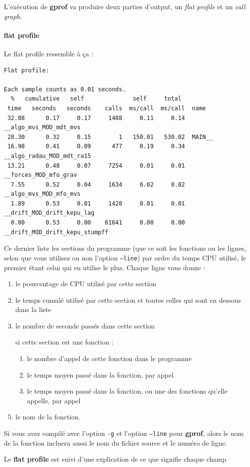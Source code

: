 \documentclass[a4paper,twoside]{article}
\begin{document}
L'exécution de \textbf{gprof} va produire deux parties d'output, un \textit{flat profile} et un \textit{call graph}.
\paragraph{flat profile}
Le flat profile ressemble à ça : 
\begin{verbatim}
Flat profile:

Each sample counts as 0.01 seconds.
  %   cumulative   self              self     total           
 time   seconds   seconds    calls  ms/call  ms/call  name    
 32.08      0.17     0.17     1488     0.11     0.14  __algo_mvs_MOD_mdt_mvs
 28.30      0.32     0.15        1   150.01   530.02  MAIN__
 16.98      0.41     0.09      477     0.19     0.34  __algo_radau_MOD_mdt_ra15
 13.21      0.48     0.07     7254     0.01     0.01  __forces_MOD_mfo_grav
  7.55      0.52     0.04     1634     0.02     0.02  __algo_mvs_MOD_mfo_mvs
  1.89      0.53     0.01     1428     0.01     0.01  __drift_MOD_drift_kepu_lag
  0.00      0.53     0.00    61641     0.00     0.00  __drift_MOD_drift_kepu_stumpff
\end{verbatim}

Ce dernier liste les sections du programme (que ce soit les fonctions ou les lignes, selon que vous utilisez ou non l'option \texttt{--line}) par ordre du temps CPU utilisé, le premier étant celui qui en utilise le plus. Chaque ligne vous donne : 
\begin{enumerate}
\item le pourcentage de CPU utilisé par cette section
\item le temps cumulé utilisé par cette section et toutes celles qui sont en dessous dans la liste
\item le nombre de seconde passés dans cette section
\item [si cette section est une fonction] : 
\begin{enumerate}
\item le nombre d'appel de cette fonction dans le programme
\item le temps moyen passé dans la fonction, par appel
\item le temps moyen passé dans la fonction, ou une des fonctions qu'elle appelle, par appel
\end{enumerate}
\item le nom de la fonction.
\end{enumerate}

\begin{remarque}
Si vous avez compilé avec l'option \texttt{-g} et l'option \texttt{--line} pour \textbf{gprof}, alors le nom de la fonction incluera aussi le nom du fichier source et le numéro de ligne. 

Le \textbf{flat profile} est suivi d'une explication de ce que signifie chaque champ.
\end{remarque}
\end{document}
